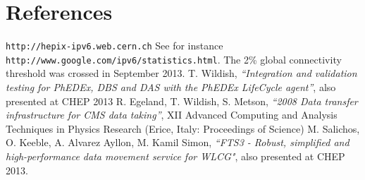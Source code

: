 \section*{References}

\begin{thebibliography}{1}
 {\tt http://hepix-ipv6.web.cern.ch}
 See for instance {\tt http://www.google.com/ipv6/statistics.html}. The 2\% global connectivity threshold was crossed in September 2013.
    T. Wildish, {\it ``Integration and validation testing for PhEDEx, DBS and DAS with the PhEDEx LifeCycle agent''}, also presented at CHEP 2013
    R. Egeland, T. Wildish, S. Metson, {\it ``2008 Data transfer infrastructure for CMS data taking''},  XII Advanced Computing and Analysis Techniques in Physics Research (Erice, Italy: Proceedings of Science)
    M. Salichos, O. Keeble, A. Alvarez Ayllon, M. Kamil Simon, {\it ``FTS3 - Robust, simplified and high-performance data movement service for WLCG"}, also presented at CHEP 2013.
\end{thebibliography}
